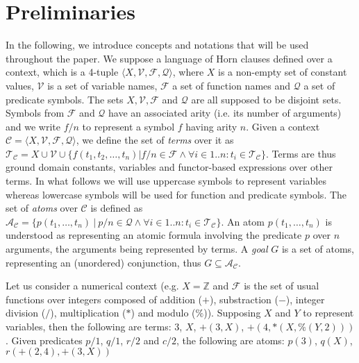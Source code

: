 \section{Preliminaries}\label{section-preliminaries}
In the following, we introduce concepts and notations that will be used throughout the paper. We suppose a language of Horn clauses defined over a context, which is a 4-tuple $\langle X, \mathcal{V}, \mathcal{F}, \mathcal{Q}\rangle$, where $X$ is a non-empty set of constant values, $\mathcal{V}$ is a set of variable names, $\mathcal{F}$ a set of function names and $\mathcal{Q}$ a set of predicate symbols. The sets $X, \mathcal{V}, \mathcal{F}$ and $\mathcal{Q}$ are all supposed to be disjoint sets. Symbols from $\mathcal{F}$ and $\mathcal{Q}$ have an associated arity (i.e. its number of arguments) and we write $f/n$ to represent a symbol $f$ having arity $n$. Given a context $\mathcal{C} = \langle X, \mathcal{V}, \mathcal{F}, \mathcal{Q}\rangle$, we define the set of \textit{terms} over it as $\mathcal{T}_\mathcal{C}= X \cup \mathcal{V} \cup \{f(t_1, t_2, \dots, t_n) | f/n \in \mathcal{F}\wedge\forall i \in 1..n : t_i \in \mathcal{T}_\mathcal{C}\}$. Terms are thus ground domain constants, variables and functor-based expressions over other terms. In what follows we will use uppercase symbols to represent variables whereas lowercase symbols will be used for function and predicate symbols. 
The set of \textit{atoms} over $\mathcal{C}$ is defined as $\mathcal{A}_\mathcal{C}=\{p(t_1,\ldots,t_n)\:|\:p/n\in \mathcal{Q} \wedge \forall i\in 1..n:t_i\in\mathcal{T}_\mathcal{C}\}$. An atom $p(t_1,\ldots,t_n)$ is understood as representing an atomic formula involving the predicate $p$ over $n$ arguments, the arguments being represented by terms.
%
A \textit{goal} $G$ is a set of atoms, representing an (unordered) conjunction, thus $G\subseteq\mathcal{A}_\mathcal{C}$. 

\begin{example}\label{ex:syntax}
    Let us consider a numerical context (e.g. $X = \mathbb{Z}$ and $\mathcal{F}$ is the set of usual functions over integers composed of addition ($+$), substraction ($-$), integer division ($/$), multiplication ($*$) and modulo ($\%$)). Supposing $X$ and $Y$ to represent variables, then the following are terms: $3$, $X$, $+(3,X)$,  $+(4, *(X,\%(Y, 2)))$.
    Given predicates $p/1$, $q/1$, $r/2$ and $c/2$, the following are atoms: $p(3)$, $q(X)$, $r(+(2,4), +(3,X))$
\end{example}


